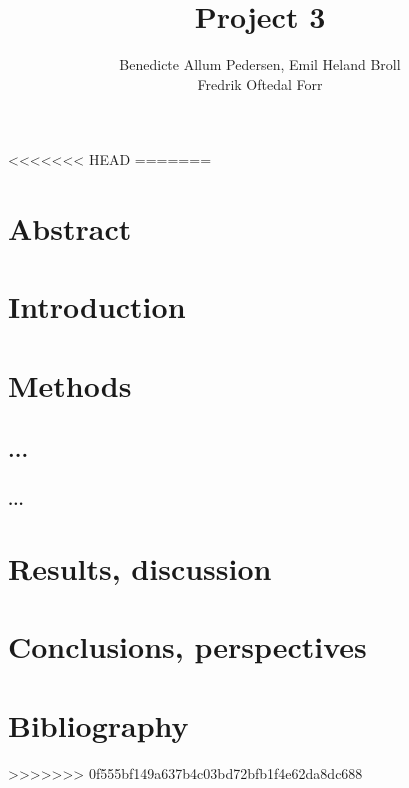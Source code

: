 \documentclass{article}
\title{Project 3}\vspace{-3ex}
\author{Benedicte Allum Pedersen, Emil Heland Broll\\ Fredrik Oftedal Forr}
\date{\vspace{-5ex}}
\begin{document}
\maketitle

<<<<<<< HEAD
=======
\section{Abstract}


\section{Introduction}



\section{Methods}
	\subsection{...}


		\subsubsection{...}

\section{Results, discussion}


\section{Conclusions, perspectives}



\section{Bibliography}


>>>>>>> 0f555bf149a637b4c03bd72bfb1f4e62da8dc688
\end{document}
